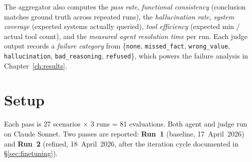 The aggregator also computes the \emph{pass rate}, \emph{functional consistency} (conclusion matches ground truth across repeated runs), the \emph{hallucination rate}, \emph{system coverage} (expected systems actually queried), \emph{tool efficiency} (expected min / actual tool count), and the \emph{measured agent resolution time} per run. Each judge output records a \emph{failure category} from \{\texttt{none}, \texttt{missed\_fact}, \texttt{wrong\_value}, \texttt{hallucination}, \texttt{bad\_reasoning}, \texttt{refused}\}, which powers the failure analysis in Chapter~\ref{ch:results}.

\section{Setup}

Each pass is 27 scenarios $\times$ 3 runs = 81 evaluations. Both agent and judge run on Claude Sonnet. Two passes are reported: \textbf{Run~1} (baseline, 17~April~2026) and \textbf{Run~2} (refined, 18~April~2026, after the iteration cycle documented in \S\ref{sec:finetuning}).
